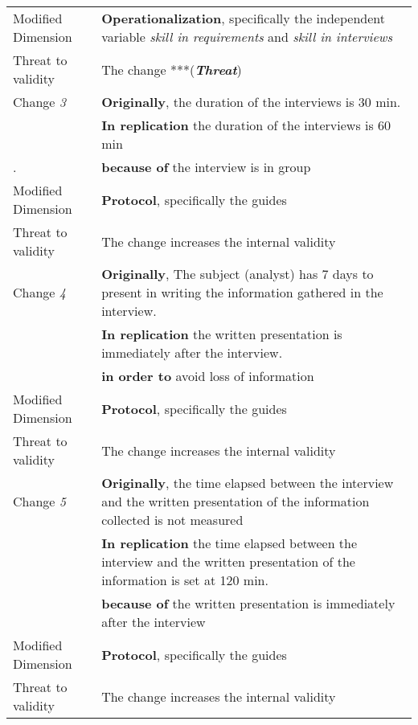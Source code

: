 \begin{table*}[h]
\begin{tabularx}{\textwidth}{
  >{\hsize=0.3\hsize}X
  >{\hsize=0.8\hsize}X}
    Modified Dimension & 
   \textbf{Operationalization}, specifically the independent variable  \textit {skill in requirements} and \textit {skill in interviews} \\ 
     Threat to validity  & The change ***(\textbf{\textit{Threat}}) \\ \hline
    
 
    Change \textit{3}   & \textbf{Originally}, the duration of the interviews is 30 min. \\& \textbf{In replication} the duration of the interviews is 60 min  \\.  
    & \textbf{because of} the interview is in group\\

    Modified Dimension & 
    \textbf{Protocol}, specifically the guides \\   
    Threat to validity & The change increases the internal validity  \\  \hline

    Change \textit{4}   & \textbf{Originally}, The subject (analyst) has 7 days to present in writing the information gathered in the interview. \\& \textbf{In replication} the written presentation is immediately after the interview. \\& \textbf{in order to} avoid loss of information \\ 

    Modified Dimension & 
    \textbf{Protocol}, specifically the guides \\   
    Threat to validity & The change increases the internal validity  \\  \hline
    
     Change \textit{5}   & \textbf{Originally}, the time elapsed between the interview and the written presentation of the information collected is not measured \\& \textbf{In replication} the time elapsed between the interview and the written presentation of the information is set at 120 min.  \\ 
     & \textbf{because of} the written presentation is immediately after the interview\\
     
    Modified Dimension & 
    \textbf{Protocol}, specifically the guides \\   
    Threat to validity & The change increases the internal validity  \\  \hline
    

\end{tabularx}
\end{table*}
